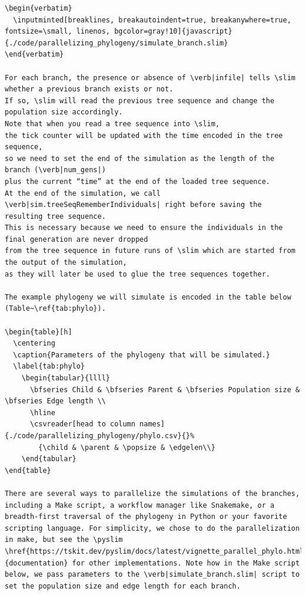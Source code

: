 \documentclass[12pt]{article}
\newcommand{\slim}[0]{\texttt{SLiM}\xspace}
\newcommand{\pyslim}[0]{\texttt{pyslim}\xspace}
\begin{document}
\begin{lstlisting}[language=slim]
\begin{verbatim}
  \inputminted[breaklines, breakautoindent=true, breakanywhere=true, fontsize=\small, linenos, bgcolor=gray!10]{javascript}{./code/parallelizing_phylogeny/simulate_branch.slim}
\end{verbatim}

For each branch, the presence or absence of \verb|infile| tells \slim whether a previous branch exists or not.
If so, \slim will read the previous tree sequence and change the population size accordingly.
Note that when you read a tree sequence into \slim,
the tick counter will be updated with the time encoded in the tree sequence,
so we need to set the end of the simulation as the length of the branch (\verb|num_gens|)
plus the current “time” at the end of the loaded tree sequence.
At the end of the simulation, we call \verb|sim.treeSeqRememberIndividuals| right before saving the resulting tree sequence.
This is necessary because we need to ensure the individuals in the final generation are never dropped
from the tree sequence in future runs of \slim which are started from the output of the simulation,
as they will later be used to glue the tree sequences together.

The example phylogeny we will simulate is encoded in the table below (Table~\ref{tab:phylo}).

\begin{table}[h]
  \centering
  \caption{Parameters of the phylogeny that will be simulated.}
  \label{tab:phylo}
    \begin{tabular}{llll}
      \bfseries Child & \bfseries Parent & \bfseries Population size & \bfseries Edge length \\
      \hline
      \csvreader[head to column names]{./code/parallelizing_phylogeny/phylo.csv}{}%
        {\child & \parent & \popsize & \edgelen\\}
    \end{tabular}
\end{table}

There are several ways to parallelize the simulations of the branches, including a Make script, a workflow manager like Snakemake, or a breadth-first traversal of the phylogeny in Python or your favorite scripting language. For simplicity, we chose to do the parallelization in make, but see the \pyslim \href{https://tskit.dev/pyslim/docs/latest/vignette_parallel_phylo.html}{documentation} for other implementations. Note how in the Make script below, we pass parameters to the \verb|simulate_branch.slim| script to set the population size and edge length for each branch.


\end{lstlisting}
\end{document}
